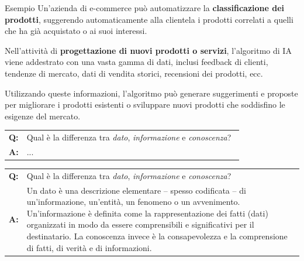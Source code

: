 \documentclass[
    notheorems,
    11pt,
    compress,
    aspectratio=169
]{beamer}
\begin{document}
\begin{frame}

    \begin{block}{Esempio}
        Un'azienda di e-commerce può automatizzare la \textbf{classificazione dei prodotti}, suggerendo automaticamente alla clientela i prodotti correlati a quelli che ha già acquistato o ai suoi interessi.

        \vspace{\baselineskip}
        
        Nell'attività di \textbf{progettazione di nuovi prodotti o servizi}, l'algoritmo di IA viene addestrato con una vasta gamma di dati, inclusi feedback di clienti, tendenze di mercato, dati di vendita storici, recensioni dei prodotti, ecc.

        \vspace{\baselineskip}

        Utilizzando queste informazioni, l'algoritmo può generare suggerimenti e proposte per migliorare i prodotti esistenti o sviluppare nuovi prodotti che soddisfino le esigenze del mercato.
    \end{block}
\end{frame}

\begin{frame}

    \begin{tabular}{@{}l l@{}}
        \textbf{Q:} & Qual è la differenza tra \textit{dato}, \textit{informazione} e \textit{conoscenza}?~\footnotemark[1]
        \\
        \textbf{A:} & ...
    \end{tabular}

\end{frame}

\begin{frame}

    \begin{tabularx}{\textwidth}{@{}l X@{}}
        \textbf{Q:} & Qual è la differenza tra \textit{dato}, \textit{informazione} e \textit{conoscenza}?~\footnotemark[1]
        \\
        \textbf{A:} & Un dato è una descrizione elementare -- spesso codificata -- di un'informazione, un'entità, un fenomeno o un avvenimento. Un'informazione è definita come la rappresentazione dei fatti (dati) organizzati in modo da essere comprensibili e significativi per il destinatario. La conoscenza invece è la consapevolezza e la comprensione di fatti, di verità e di informazioni.
    \end{tabularx}

\end{frame}
\end{document}
